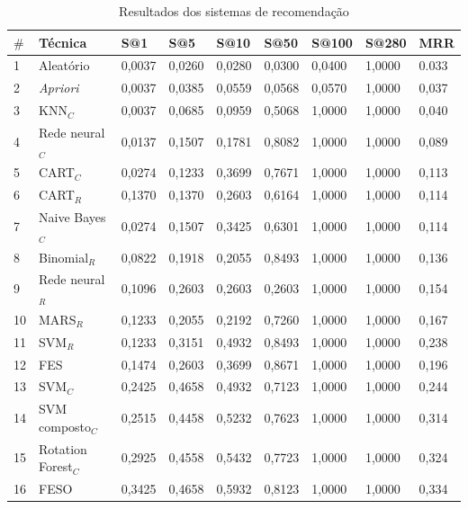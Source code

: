 \documentclass[10pt,letterpaper]{article}
\begin{document}
\begin{table}[!htp]
	\centering
	\caption{Resultados dos sistemas de recomendação}
	\begin{tabular}{|l|l|l|l|l|l|l|l|l|} \hline
		\textbf{\(\mathbf{\#}\)} & \textbf{Técnica}&\textbf{S@1}&\textbf{S@5} & \textbf{S@10} & \textbf{S@50} & \textbf{S@100} & \textbf{S@280} & \textbf{MRR} \\ \hline
		
		1  & Aleatório				& 0,0037 & 0,0260 & 0,0280 & 0,0300 & 0,0400 & 1,0000 & 0.033 \\ \hline
		2  & \emph{Apriori}			& 0,0037 & 0,0385 & 0,0559 & 0,0568 & 0,0570 & 1,0000 & 0,037 \\ \hline
		3  & KNN\(_C\)				& 0,0037 & 0,0685 & 0,0959 & 0,5068 & 1,0000 & 1,0000 & 0,040 \\ \hline
		4  & Rede neural\(_C\)		& 0,0137 & 0,1507 & 0,1781 & 0,8082 & 1,0000 & 1,0000 & 0,089 \\ \hline
		5  & CART\(_C\)				& 0,0274 & 0,1233 & 0,3699 & 0,7671 & 1,0000 & 1,0000 & 0,113 \\ \hline
		6  & CART\(_R\)    			& 0,1370 & 0,1370 & 0,2603 & 0,6164 & 1,0000 & 1,0000 & 0,114 \\ \hline
		7  & Naive Bayes\(_C\)     	& 0,0274 & 0,1507 & 0,3425 & 0,6301 & 1,0000 & 1,0000 & 0,114 \\ \hline
		8  & Binomial\(_R\) 		& 0,0822 & 0,1918 & 0,2055 & 0,8493 & 1,0000 & 1,0000 & 0,136 \\ \hline
		9  & Rede neural\(_R\)     	& 0,1096 & 0,2603 & 0,2603 & 0,2603 & 1,0000 & 1,0000 & 0,154 \\ \hline
		10 & MARS\(_R\)     		& 0,1233 & 0,2055 & 0,2192 & 0,7260 & 1,0000 & 1,0000 & 0,167 \\ \hline
		11 & SVM\(_R\)     			& 0,1233 & 0,3151 & 0,4932 & 0,8493 & 1,0000 & 1,0000 & 0,238 \\ \hline
		12 & FES           			& 0,1474 & 0,2603 & 0,3699 & 0,8671 & 1,0000 & 1,0000 & 0,196 \\ \hline
		13 & SVM\(_C\)    			& 0,2425 & 0,4658 & 0,4932 & 0,7123 & 1,0000 & 1,0000 & 0,244 \\ \hline
		14 & SVM composto\(_C\)		& 0,2515 & 0,4458 & 0,5232 & 0,7623 & 1,0000 & 1,0000 & 0,314 \\ \hline
		15 & Rotation Forest\(_C\)  & 0,2925 & 0,4558 & 0,5432 & 0,7723 & 1,0000 & 1,0000 & 0,324 \\ \hline
		16 & FESO          			& 0,3425 & 0,4658 & 0,5932 & 0,8123 & 1,0000 & 1,0000 & 0,334 \\ \hline
	\end{tabular}
	\label{tb_resultadosExperimentos}
	\vspace{0.1cm}
\end{table}
\egroup
\end{document}
